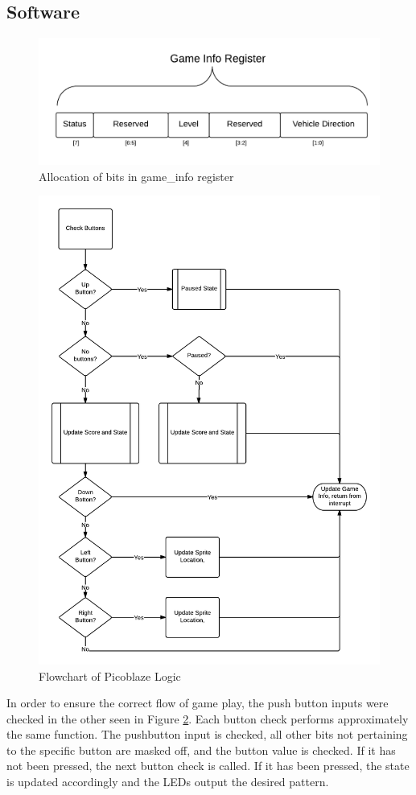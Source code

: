 \documentclass[11pt]{article}
\begin{document}
		
\subsection{Software}

					
		\begin{figure}[h]\centering
		  \includegraphics[width=.7\textwidth]{Images/game_info_bits.png}
		  \caption{Allocation of bits in game\_info register}
		  \label{game_info_bits}
		\end{figure}	

		\begin{figure}[h!]\centering
		  \includegraphics[width=.8\textwidth]{Images/game_logic.png}
		  \caption{Flowchart of Picoblaze Logic}
		  \label{game_logic}
		\end{figure}	


In order to ensure the correct flow of game play, the push button inputs were checked in the other seen in Figure \ref{game_logic}.  Each button check performs approximately the same function.  The pushbutton input is checked, all other bits not pertaining to the specific button are masked off, and the button value is checked.  If it has not been pressed, the next button check is called.  If it has been pressed, the state is updated accordingly and the LEDs output the desired pattern. 
\end{document}
